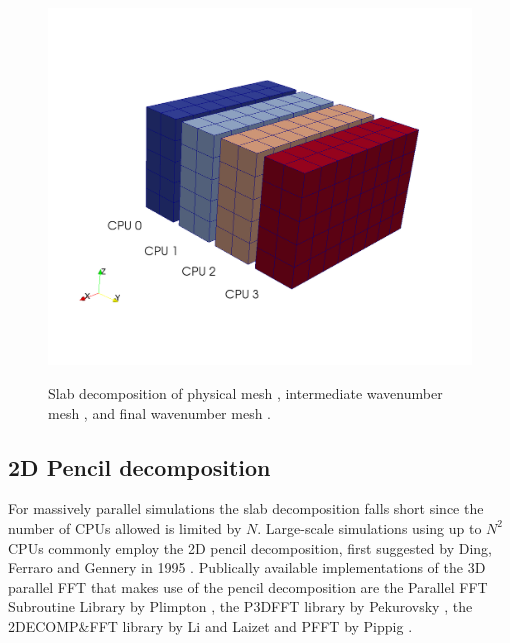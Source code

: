 \documentclass[11pt, oneside]{article}
\begin{document}
\begin{figure}[t!]
{  \includegraphics[scale=0.15]{slabZ3.png}
  \label{slabsubfig2}
  }
\caption{Slab decomposition of physical mesh , intermediate wavenumber mesh , and final wavenumber mesh .  }
\label{fig:Slabdecomp}
\end{figure}

\subsection{2D Pencil decomposition}
\label{pencil2D}

For massively parallel simulations the slab decomposition falls short since the number of CPUs allowed is limited by $N$. Large-scale simulations using up to $N^2$ CPUs commonly employ the 2D pencil decomposition, first suggested by Ding, Ferraro and Gennery in 1995 \cite{Ding95}. Publically available implementations of the 3D parallel FFT that makes use of the pencil decomposition are the Parallel FFT Subroutine Library by Plimpton \cite{PlimptonFFT}, the P3DFFT library by Pekurovsky \cite{p3dfft, pekurovsky2012}, the 2DECOMP\&FFT library by Li and Laizet \cite{Li2010} and PFFT by Pippig \cite{Pi13}.
\end{document}
